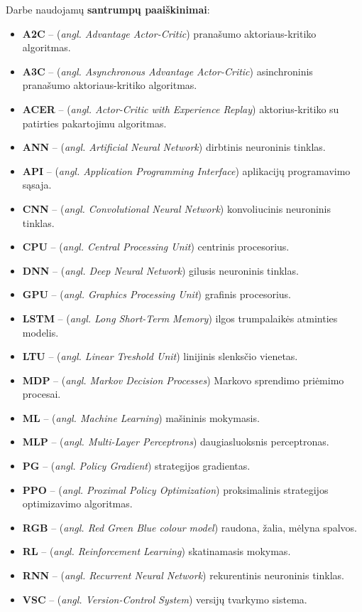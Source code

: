 \documentclass{VUMIFPSbakalaurinis}
\begin{document}
{
	Darbe naudojamų \textbf{santrumpų paaiškinimai}:
	\begin{itemize}
		\item \textbf{A2C} -- (\textit{angl. Advantage Actor-Critic}) pranašumo aktoriaus-kritiko algoritmas.
		\item \textbf{A3C} -- (\textit{angl. Asynchronous Advantage Actor-Critic}) asinchroninis pranašumo aktoriaus-kritiko algoritmas.
		\item \textbf{ACER} -- (\textit{angl. Actor-Critic with Experience Replay}) aktorius-kritiko su patirties pakartojimu algoritmas.
		\item \textbf{ANN} -- (\textit{angl. Artificial Neural Network}) dirbtinis neuroninis tinklas.
		\item \textbf{API} -- (\textit{angl. Application Programming Interface}) aplikacijų programavimo sąsaja.
		\item \textbf{CNN} -- (\textit{angl. Convolutional Neural Network}) konvoliucinis neuroninis tinklas.
		\item \textbf{CPU} -- (\textit{angl. Central Processing Unit}) centrinis procesorius.
		\item \textbf{DNN} -- (\textit{angl. Deep Neural Network}) gilusis neuroninis tinklas.
		\item \textbf{GPU} -- (\textit{angl. Graphics Processing Unit}) grafinis procesorius.
		\item \textbf{LSTM} -- (\textit{angl. Long Short-Term Memory}) ilgos trumpalaikės atminties modelis.
		\item \textbf{LTU} -- (\textit{angl. Linear Treshold Unit}) linijinis slenksčio vienetas.
		\item \textbf{MDP} -- (\textit{angl. Markov Decision Processes}) Markovo sprendimo priėmimo procesai.
		\item \textbf{ML} -- (\textit{angl. Machine Learning}) mašininis mokymasis.
		\item \textbf{MLP} -- (\textit{angl. Multi-Layer Perceptrons}) daugiasluoksnis perceptronas.
		\item \textbf{PG} -- (\textit{angl. Policy Gradient}) strategijos gradientas.
		\item \textbf{PPO} -- (\textit{angl. Proximal Policy Optimization}) proksimalinis strategijos optimizavimo algoritmas.
		\item \textbf{RGB} -- (\textit{angl. Red Green Blue colour model}) raudona, žalia, mėlyna spalvos.
		\item \textbf{RL} -- (\textit{angl. Reinforcement Learning}) skatinamasis mokymas.
		\item \textbf{RNN} -- (\textit{angl. Recurrent Neural Network}) rekurentinis neuroninis tinklas.
		\item \textbf{VSC} -- (\textit{angl. Version-Control System}) versijų tvarkymo sistema.
	\end{itemize}
}
\end{document}
